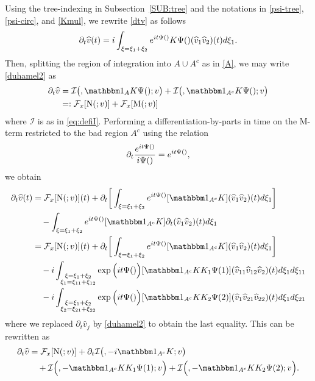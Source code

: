 \documentclass[a4paper,
11pt,  reqno]{amsart}
\makeatletter
\newcommand{\5}{\textup{V}}
\newcommand{\ft}{\widehat}
\newcommand{\ind}{\mathbbm 1}
\newcommand{\dt}{\partial_t}
\theoremstyle{remark}
\newcommand{\Ft}{{\mathcal{F}}}
\def\<#1>{\csname MH@symb@#1\endcsname}
\newcommand{\Ical}{\mathcal{I}}
\numberwithin{equation}{section}
\numberwithin{theorem}{section}
\newcommand{\MM}{\mathrm{M}}
\newcommand{\NN}{\mathrm{N}}
\makeatother
\begin{document}
Using the tree-indexing in Subsection~\ref{SUB:tree} and the notations in \eqref{psi-tree}, \eqref{psi-circ}, and \eqref{Kmul}, we rewrite \eqref{dtv} as follows
\begin{align}
\label{duhamel2}
\dt\ft v(t) =  i \int_{\xi = \xi_1 + \xi_2} e^{it \Psi(\<1>)}  K \Psi(\<1>)   (\widehat{v}_{1} \widehat{v}_{2}) (t)
d\xi_{1}.
\end{align}
Then, splitting the region of integration into $A\cup A^c$ as in \eqref{A}, we may write \eqref{duhamel2} as
\begin{align}
\dt\ft v
&
=
\Ical\big( \<1>, \ind_A K \Psi(\<1>); v
\big)
+ \Ical\big( \<1>, \ind_{A^c} K \Psi(\<1>) ;v
\big)
\\
&
=: \Ft_x[ \NN ( \<1>; v )] + \Ft_x[ \MM(\<1>; v) ]
\label{NFE000}
\end{align}
where $\Ical$ is as in \eqref{eq:defiI}. Performing a differentiation-by-parts in time on the $\MM$-term restricted to the bad region $A^c$ using the relation
$$
\dt\frac{e^{it\Psi(\<1>)}}{i\Psi(\<1>)}=e^{it\Psi(\<1>)},
$$
we obtain
\begin{align}
\label{NFE01}
\begin{split}
\dt\ft v(t)
&=
\Ft_x[ \NN ( \<1>; v )] (t)
+ \dt\bigg[ \int_{\xi = \xi_1 + \xi_2} e^{it \Psi(\<1>)}
[\ind_{A^c}
 K ]
(\ft v_{1} \ft v_{2} )(t)
d\xi_{1}
\bigg]
\\
&
\quad
-
   \int_{\xi = \xi_1 + \xi_2} e^{it \Psi(\<1>)}
[ \ind_{A^c} K ]
\partial_{t} (\ft v_{1} \ft v_{2} )(t)
d\xi_{1}
\\
& =
\Ft_x[ \NN ( \<1>; v )] (t)
+  \dt\bigg[ \int_{\xi = \xi_1 + \xi_2} e^{it \Psi(\<1>)}
[\ind_{A^c}
 K ]
(\ft v_{1} \ft v_{2} )(t)
d\xi_{1}
\bigg]
\\
&
\quad
- i
 \int_{\substack{\xi = \xi_1 + \xi_2 \\ \xi_1 = \xi_{11}+ \xi_{12}  }} \exp\Big(it \Psi(\<21>) \Big)
[ \ind_{A^c} K K_1 \Psi(1) ]
 (\ft v_{11} \ft v_{12} \ft v_2 )(t)
d\xi_{1} d\xi_{11}
\\
&
\quad
-i  \int_{\substack{\xi = \xi_1 + \xi_2 \\ \xi_2 = \xi_{21}+ \xi_{22}  }} \exp\Big(it \Psi(\<22>) \Big)
[ \ind_{A^c} K K_2 \Psi(2) ]
 (\ft v_{1} \ft v_{21} \ft v_{22} )(t)
d\xi_{1} d\xi_{21}
\end{split}
\end{align}
where we replaced $\dt \ft v_j$ by \eqref{duhamel2} to obtain the last equality. This can be rewritten as
\begin{align}
\label{NFE00}
\begin{split}
\dt\ft v
&
=
 \Ft_x[ \NN ( \<1>; v )]
+
\dt\Ical \big( \<1>,  - i \ind_{A^c} K; v \big)
\\
&
\quad
+
\Ical \Big( \<21>, - \ind_{A^c} KK_1\Psi(1) ; v  \Big)
+
\Ical \Big( \<22>, - \ind_{A^c} KK_2\Psi(2) ; v  \Big)
.
\end{split}
\end{align}
\end{document}
